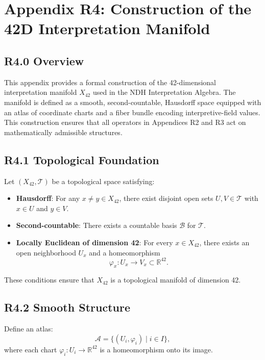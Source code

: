 \appendix
\section*{Appendix R4: Construction of the 42D Interpretation Manifold}

\subsection*{R4.0 Overview}

This appendix provides a formal construction of the 42-dimensional
interpretation manifold $X_{42}$ used in the NDH Interpretation Algebra.
The manifold is defined as a smooth, second-countable, Hausdorff space
equipped with an atlas of coordinate charts and a fiber bundle encoding
interpretive-field values. This construction ensures that all operators
in Appendices R2 and R3 act on mathematically admissible structures.

\subsection*{R4.1 Topological Foundation}

Let $(X_{42}, \mathcal{T})$ be a topological space satisfying:

\begin{itemize}
    \item \textbf{Hausdorff}: For any $x \neq y \in X_{42}$, there exist
    disjoint open sets $U, V \in \mathcal{T}$ with $x \in U$ and
    $y \in V$.

    \item \textbf{Second-countable}: There exists a countable basis
    $\mathcal{B}$ for $\mathcal{T}$.

    \item \textbf{Locally Euclidean of dimension 42}: For every
    $x \in X_{42}$, there exists an open neighborhood $U_x$ and a
    homeomorphism
    \[
    \varphi_x : U_x \to V_x \subset \mathbb{R}^{42}.
    \]
\end{itemize}

These conditions ensure that $X_{42}$ is a topological manifold of
dimension 42.

\subsection*{R4.2 Smooth Structure}

Define an atlas:
\[
\mathcal{A} = \{ (U_i, \varphi_i) \mid i \in I \},
\]
where each chart $\varphi_i : U_i \to \mathbb{R}^{42}$ is a homeomorphism
onto its image.

